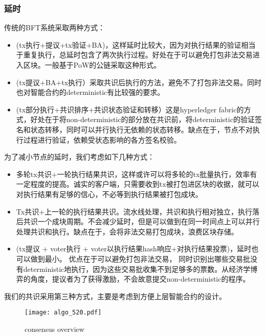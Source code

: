 \documentclass[12pt, UTF8]{article}
\begin{document}
\subsubsection{延时}
传统的BFT系统采取两种方式：
\begin{itemize}
\item (tx执行+提议+tx验证+BA)，这样延时比较大，因为对执行结果的验证相当于重复执行，总延时包含了两次执行过程。好处在于可以避免打包非法交易进入区块。一般基于PoW的公链采取这种形式。
\item (tx提议+BA+tx执行）采取共识后执行的方法，避免不了打包非法交易。同时也对智能合约的deterministic有比较强的要求。%
\item (tx部分执行+共识排序+共识状态验证和转移）这是hyperledger fabric的方式，好处在于将non-deterministic的部分放在共识前，将deterministic的验证签名和状态转移，同时可以并行执行无依赖的状态转移。缺点在于，节点不对执行过程进行验证，依赖受状态影响的各方签名校验。
\end{itemize}
为了减小节点的延时，我们考虑如下几种方式：
\begin{itemize}
\item 多轮tx共识+一轮执行结果共识，这样或许可以将多轮的tx批量执行，效率有一定程度的提高。诚实的客户端，只需要收到tx被打包进区块的收据，就可以对执行结果有足够的信心，不必等到执行结果被打包成块。
\item Tx共识+上一轮的执行结果共识。流水线处理，共识和执行相对独立，执行落后共识一个成块周期。不会减少延时，但是可以做到在同一时间点上可以并行处理共识和执行。缺点在于，会将非法交易打包成块，浪费区块存储。
\item (tx提议 + voter执行 + voter以执行结果hash响应+对执行结果投票)，延时也可以做到最小。 优点在于可以避免打包非法交易， 同时识别出哪些交易批没有deterministic地执行，因为这些交易批收集不到足够多的票数。从经济学博弈的角度，提议者为了获得激励，不会故意提交non-deterministic的程序。
\end{itemize}
我们的共识采用第三种方式，主要是考虑到方便上层智能合约的设计。

\begin{figure}[!thb]
\centering
    \texttt{[image: algo\_520.pdf]}
    \caption{consensus overview}
    \label{fig:consensus}
\end{figure}
\end{document}

